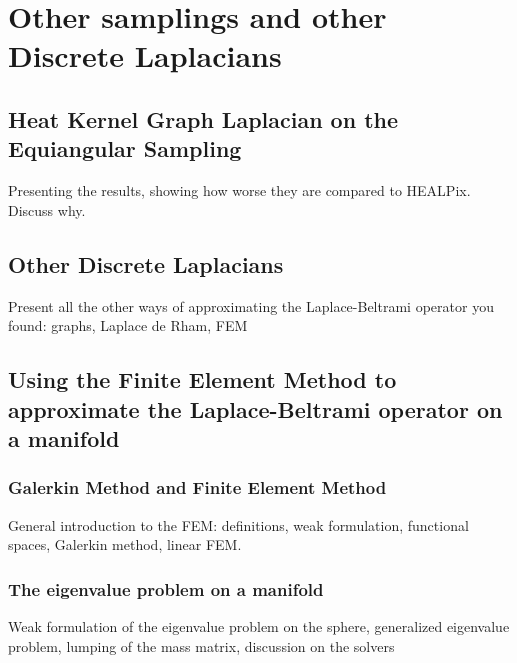 

\section{Other samplings and other Discrete Laplacians}

\subsection{Heat Kernel Graph Laplacian on the Equiangular Sampling}
\label{sec:Heat Kernel Graph Laplacian on the Equiangular Sampling}
Presenting the results, showing how worse they are compared to HEALPix. Discuss why.
\subsection{Other Discrete Laplacians}
Present all the other ways of approximating the Laplace-Beltrami operator you found: graphs, Laplace de Rham, FEM
\subsection{Using the Finite Element Method to approximate the Laplace-Beltrami operator on a manifold}
\subsubsection{Galerkin Method and Finite Element Method}
General introduction to the FEM: definitions, weak formulation, functional spaces, Galerkin method, linear FEM.
\subsubsection{The eigenvalue problem on a manifold}
Weak formulation of the eigenvalue problem on the sphere, generalized eigenvalue problem, lumping of the mass matrix, discussion on the solvers
